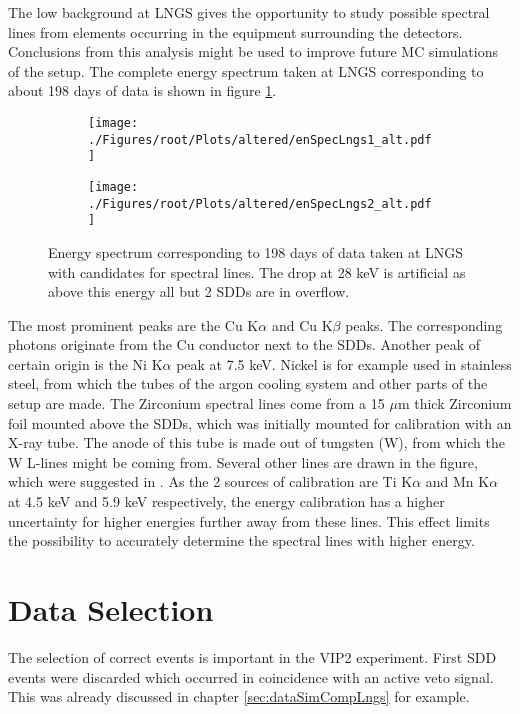 The low background at LNGS gives the opportunity to study possible spectral lines from elements occurring in the equipment surrounding the detectors. Conclusions from this analysis might be used to improve future MC simulations of the setup. The complete energy spectrum taken at LNGS corresponding to about 198 days of data is shown in figure \ref{fig:spectralAna}.
\begin{figure}[h]
 \centering
 \begin{subfigure}{.49\textwidth}
 \centering
 \texttt{[image: ./Figures/root/Plots/altered/enSpecLngs1\_alt.pdf]}
 \end{subfigure}
 \hfill
 \begin{subfigure}{.46\textwidth}
 \centering
 \texttt{[image: ./Figures/root/Plots/altered/enSpecLngs2\_alt.pdf]}
 \end{subfigure}
 \caption{Energy spectrum corresponding to 198 days of data taken at LNGS with candidates for spectral lines. The drop at 28 keV is artificial as above this energy all but 2 SDDs are in overflow.}
 \label{fig:spectralAna}
\end{figure}
The most prominent peaks are the Cu K$\alpha$ and Cu K$\beta$ peaks. The corresponding photons originate from the Cu conductor next to the SDDs. Another peak of certain origin is the Ni K$\alpha$ peak at 7.5 keV. Nickel is for example used in stainless steel, from which the tubes of the argon cooling system and other parts of the setup are made. The Zirconium spectral lines come from a 15 $\mu$m thick Zirconium foil mounted above the SDDs, which was initially mounted for calibration with an X-ray tube. The anode of this tube is made out of tungsten (W), from which the W L-lines might be coming from. Several other lines are drawn in the figure, which were suggested in \cite{Sperandio2008}. As the 2 sources of calibration are Ti K$\alpha$ and Mn K$\alpha$ at 4.5 keV and 5.9 keV respectively, the energy calibration has a higher uncertainty for higher energies further away from these lines. This effect limits the possibility to accurately determine the spectral lines with higher energy.

\section{Data Selection}
\label{sec:DataSel}

The selection of correct events is important in the VIP2 experiment. First SDD events were discarded which occurred in coincidence with an active veto signal. This was already discussed in chapter \ref{sec:dataSimCompLngs} for example. 

